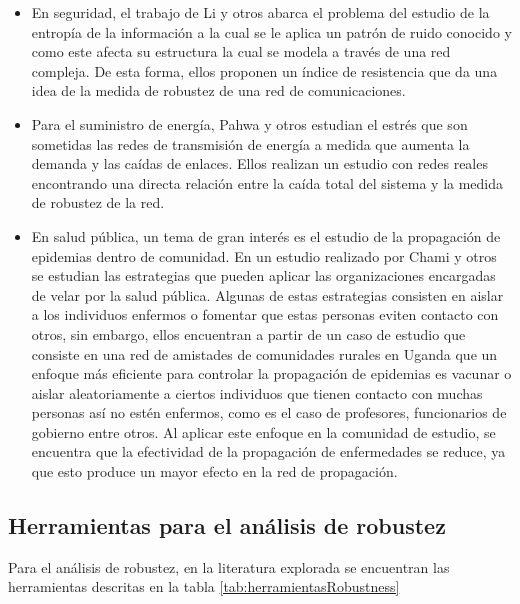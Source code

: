 \begin{itemize}
    \item En seguridad, el trabajo de Li y otros\cite{Li2016} abarca el problema del estudio de la entropía de la información a la cual se le aplica un patrón de ruido conocido y como este afecta su estructura la cual se modela a través de una red compleja. De esta forma, ellos proponen un índice de resistencia que da una idea de la medida de robustez de una red de comunicaciones.
    \item Para el suministro de energía, Pahwa y otros\cite{Pahwa2014} estudian el estrés que son sometidas las redes de transmisión de energía a medida que aumenta la demanda y las caídas de enlaces. Ellos realizan un estudio con redes reales encontrando una directa relación entre la caída total del sistema y la medida de robustez de la red.
    \item En salud pública, un tema de gran interés es el estudio de la propagación de epidemias dentro de comunidad. En un estudio realizado por Chami y otros\cite{Chami2017} se estudian las estrategias que pueden aplicar las organizaciones encargadas de velar por la salud pública. Algunas de estas estrategias consisten en aislar a los individuos enfermos o fomentar que estas personas eviten contacto con otros, sin embargo, ellos encuentran a partir de un caso de estudio que consiste en una red de amistades de comunidades rurales en Uganda que un enfoque más eficiente para controlar la propagación de epidemias es vacunar o aislar aleatoriamente a ciertos individuos que tienen contacto con muchas personas así no estén enfermos, como es el caso de profesores, funcionarios de gobierno entre otros. Al aplicar este enfoque en la comunidad de estudio, se encuentra que la efectividad de la propagación de enfermedades se reduce, ya que esto produce un mayor efecto en la red de propagación.
\end{itemize}


\subsection{Herramientas para el análisis de robustez}

Para el análisis de robustez, en la literatura explorada se encuentran las herramientas descritas en la tabla \ref{tab:herramientasRobustness}

